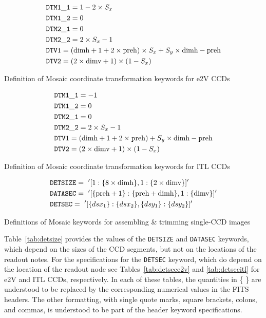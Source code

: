 \documentclass{article}[12pt]
\begin{document}
\begin{table}
\begin{align*}
& {\tt DTM1\_1} =  1 - 2 \times S_x \\
& {\tt DTM1\_2} = 0 \\
& {\tt DTM2\_1} = 0 \\
& {\tt DTM2\_2} = 2 \times S_x - 1 \\
& {\tt DTV1} = ({\rm dimh} + 1 + 2 \times {\rm preh}) \times S_x + S_y \times {\rm dimh} - {\rm preh} \\
& {\tt DTV2} = (2 \times {\rm dimv} + 1) \times (1 - S_x) \\
\end{align*}
\caption{Definition of Mosaic coordinate transformation keywords for e2V CCDs\label{tab:dtme2v}}

\end{table}

\begin{table}
\begin{align*}
& {\tt DTM1\_1} = -1 \\
& {\tt DTM1\_2} = 0 \\
& {\tt DTM2\_1} = 0 \\
& {\tt DTM2\_2} = 2 \times S_x - 1 \\
& {\tt DTV1} = ({\rm dimh} + 1 + 2 \times {\rm preh}) + S_y \times {\rm dimh} - {\rm preh}  \\
& {\tt DTV2} = (2 \times {\rm dimv} + 1) \times (1 - S_x) \\
\end{align*}
\caption{Definition of Mosaic coordinate transformation keywords for ITL CCDs\label{tab:dtmitl}}
\end{table}


\begin{table}
\begin{align*}
& {\tt DETSIZE} =~'[1: \{8 \times {\rm dimh}\}, 1: \{2 \times {\rm dimv}\}]' \\
& {\tt DATASEC} =~'[ \{{\rm preh} + 1\} : \{{\rm preh} + {\rm dimh}\}, 1 :  \{{\rm dimv}\}]' \\
& {\tt DETSEC} =~'[ \{dsx_1\} : \{dsx_2\}, \{dsy_1\}: \{dsy_2\}]' \\
\end{align*}
\caption{Definitions of Mosaic keywords for assembling \& trimming single-CCD images\label{tab:detsize}}
\end{table}

Table~\ref{tab:detsize} provides the values of the {\tt DETSIZE} and {\tt DATASEC} keywords, which depend on the sizes of the CCD segments, but not on the locations of the readout notes.  For the specifications for the {\tt DETSEC} keyword, which do depend on the location of the readout node see Tables~\ref{tab:detsece2v} and \ref{tab:detsecitl} for e2V and ITL CCDs, respectively.  In each of these tables, the quantities in \{ \} are understood to be replaced by the corresponding numerical values in the FITS headers.  The other formatting, with single quote marks, square brackets, colons, and commas, is understood to be part of the header keyword specifications.
\end{document}
